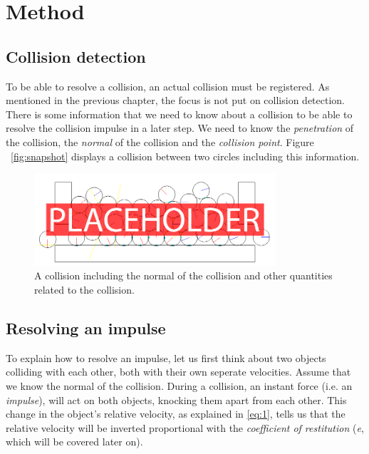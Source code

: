 \documentclass[a4paper,12pt]{report}
\begin{document}
\chapter{Method}

\section{Collision detection}

To be able to resolve a collision, an actual collision must be registered. As mentioned in the previous chapter, the focus is not put on collision detection. There is some information that we need to know about a collision to be able to resolve the collision impulse in a later step. We need to know the \emph{penetration} of the collision, the \emph{normal} of the collision and the \emph{collision point}. Figure ~\ref{fig:snapshot} displays a collision between two circles including this information.

\begin{figure}[!h]
    \centering
    \includegraphics[width=0.8\textwidth]{figures/collision.png}
    \caption{A collision including the normal of the collision and other quantities related to the collision.}
    \label{fig:collision}
\end{figure}

\section{Resolving an impulse}

To explain how to resolve an impulse\cite{gdm}, let us first think about two objects colliding with each other, both with their own seperate velocities. Assume that we know the normal of the collision. During a collision, an instant force (i.e. an \emph{impulse}), will act on both objects, knocking them apart from each other. This change in the object's relative velocity, as explained in \ref{eq:1}, tells us that the relative velocity will be inverted proportional with the \emph{coefficient of restitution} (\emph{e}, which will be covered later on).
\end{document}
